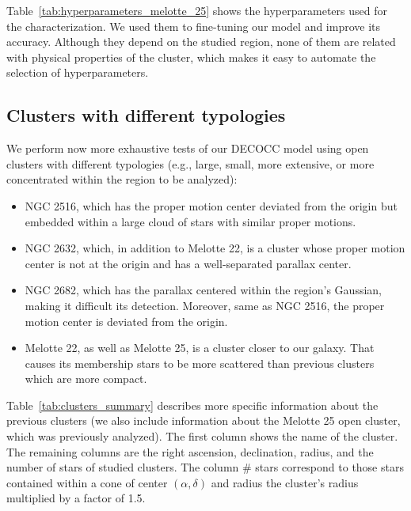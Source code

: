 \documentclass[11pt,a4paper,english,twocolumn]{article}
\begin{document}
Table~\ref{tab:hyperparameters_melotte_25} shows the hyperparameters used for the characterization. We used
them to fine-tuning our model and improve its accuracy. Although they depend on the studied region, none of
them are related with physical properties of the cluster, which makes it easy to automate the selection of
hyperparameters.

\subsection{Clusters with different typologies}

We perform now more exhaustive tests of our DECOCC model using open clusters with different typologies (e.g.,
large, small, more extensive, or more concentrated within the region to be analyzed):

\begin{itemize}
  \item NGC 2516, which has the proper motion center deviated from the origin but embedded within a large cloud
        of stars with similar proper motions.
  \item NGC 2632, which, in addition to Melotte 22, is a cluster whose proper motion center is not at the origin
        and has a well-separated parallax center.
  \item NGC 2682, which has the parallax centered within the region's Gaussian, making it difficult its detection.
        Moreover, same as NGC 2516, the proper motion center is deviated from the origin.
  \item Melotte 22, as well as Melotte 25, is a cluster closer to our galaxy. That causes its membership stars to
        be more scattered than previous clusters which are more compact.
\end{itemize}

Table~\ref{tab:clusters_summary} describes more specific information about the previous clusters (we also include
information about the Melotte 25 open cluster, which was previously analyzed). The first column shows the name of
the cluster. The remaining columns are the right ascension, declination, radius, and the number of stars of studied
clusters. The column \# stars correspond to those stars contained within a cone of center \((\alpha, \delta)\) and
radius the cluster's radius multiplied by a factor of 1.5.
\end{document}
